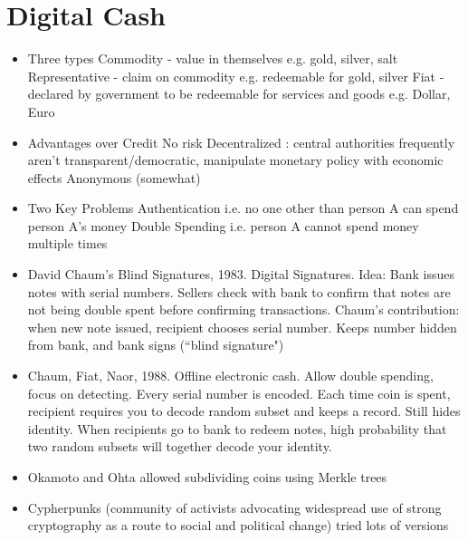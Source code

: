 \documentclass{article}
\begin{document}
\section*{Digital Cash}
\begin{itemize}
\item Three types
\subitem Commodity - value in themselves e.g. gold, silver, salt
\subitem Representative - claim on commodity e.g. redeemable for gold, silver
\subitem Fiat - declared by government to be redeemable for services and goods e.g. Dollar, Euro

\item Advantages over Credit
\subitem No risk
\subitem Decentralized : central authorities frequently aren't transparent/democratic, manipulate monetary policy with economic effects
\subitem Anonymous (somewhat)

\item Two Key Problems
\subitem Authentication i.e. no one other than person A can spend person A's money
\subitem Double Spending i.e. person A cannot spend money multiple times

\item David Chaum's Blind Signatures, 1983. Digital Signatures. Idea: Bank issues notes with serial numbers. Sellers check with bank to confirm that notes are not being double spent before confirming transactions.
\subitem Chaum's contribution: when new note issued, recipient chooses serial number. Keeps number hidden from bank, and bank signs (``blind signature")

\item Chaum, Fiat, Naor, 1988. Offline electronic cash. Allow double spending, focus on detecting. Every serial number is encoded. Each time coin is spent, recipient requires you to decode random subset and keeps a record. Still hides identity. When recipients go to bank to redeem notes, high probability that two random subsets will together decode your identity.

\item Okamoto and Ohta allowed subdividing coins using Merkle trees

\item Cypherpunks (community of activists advocating widespread use of strong cryptography as a route to social and political change) tried lots of versions
\end{itemize}
\end{document}
